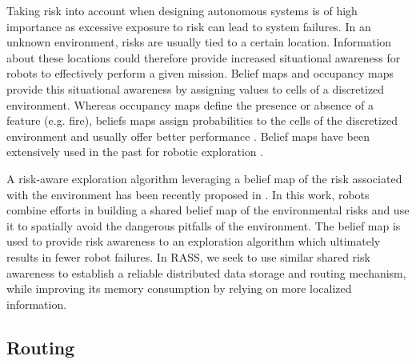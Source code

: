\documentclass[sigconf]{aamas}
\begin{document}
Taking risk into account when designing autonomous systems is of high
importance as excessive exposure to risk can lead to system
failures. In an unknown environment, risks are usually
tied to a certain location. Information about these locations could therefore
provide increased situational awareness for robots to effectively
perform a given mission. Belief maps and occupancy maps provide this
situational awareness by assigning values to cells of a discretized
environment. Whereas occupancy maps define the presence or absence of
a feature (e.g. fire), beliefs maps assign probabilities to the cells
of the discretized environment and usually offer better performance
\cite{stachnissMappingExplorationMobile2003}. Belief maps have been
extensively used in the past for robotic exploration
\cite{kobayashiSharingExploringInformation2002,
  kobayashiDeterminationExplorationTarget2003,
  indelmanCooperativeMultirobotBelief2018}.

A risk-aware exploration algorithm leveraging a belief map of the risk
associated with the environment has been recently proposed in
\cite{vielfaure2021dora}. In this work, robots combine efforts in building a shared belief map of the environmental risks and use it to spatially avoid the dangerous
pitfalls of the environment. The belief map is used to provide risk
awareness to an exploration algorithm which ultimately results in
fewer robot failures. In RASS, we seek to use similar shared risk awareness to establish a reliable distributed data storage and
routing mechanism, while improving its memory consumption by relying on more localized information.

\subsection{Routing}
\end{document}
